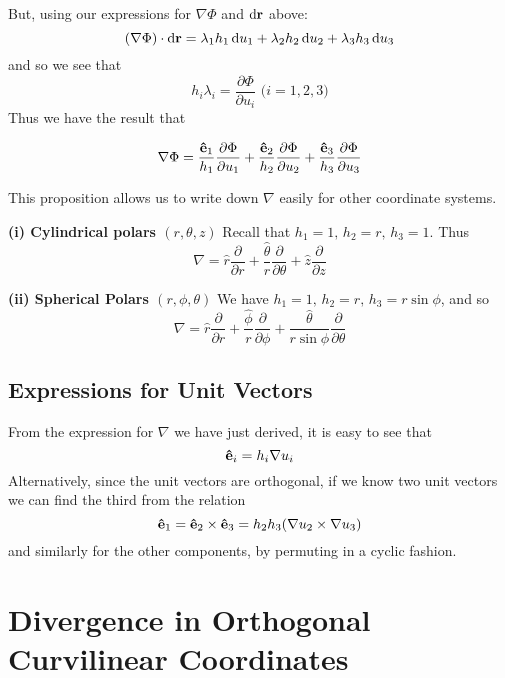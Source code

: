 But, using our expressions for $\nabla \Phi$ and $\d \mathbf r$ above:
\[
  (\nabla \Phi)\cdot \d \mathbf r = \lambda_1h_1\d u_1 + \lambda_2h_2\d u_2 + \lambda_3h_3\d u_3
\]
and so we see that 
\[
  h_i\lambda_i = \dfrac{\partial \Phi}{\partial u_i} \mbox{ ($i = 1,2,3$)}
\]
Thus we have the result that 

\begin{prop}
 \[
  \nabla \Phi = \dfrac{\mathbf{\hat e}_1}{h_1}\dfrac{\partial \Phi}{\partial u_1} + \dfrac{\mathbf{\hat e}_2}{h_2}\dfrac{\partial \Phi}{\partial u_2} + \dfrac{\mathbf{\hat e}_3}{h_3}\dfrac{\partial \Phi}{\partial u_3}
\]
\end{prop}


This proposition allows us to write down $\nabla$ easily for other coordinate systems. 


\textbf{(i) Cylindrical polars $(r,\theta,z)$}
Recall that $h_1 = 1,\, h_2 = r,\, h_3 = 1$. Thus
\[
  \nabla = \hat r \dfrac{\partial}{\partial r} + \dfrac{\hat 
  \theta}{r}\dfrac{\partial }{\partial \theta} + \hat z \dfrac{\partial }{\partial z}
\]

\textbf{(ii) Spherical Polars $(r,\phi,\theta)$}
We have $h_1 = 1,\, h_2 = r,\, h_3 = r\sin\phi$, and so 
\[
  \nabla = \hat r \dfrac{\partial }{\partial r} + \dfrac{\hat \phi}{r}\dfrac{\partial }{\partial \phi} + \dfrac{\hat \theta}{r \sin\phi}\dfrac{\partial }{\partial \theta}
\]

\subsection{Expressions for Unit Vectors}

From the expression for $\nabla$ we have just derived, it is easy to see that 
\[
  \mathbf{\hat e}_i = h_i \nabla u_i
\]
Alternatively, since the unit vectors are orthogonal, if we know two unit vectors we can find the third from the relation
\[
  \mathbf{\hat e}_1 = \mathbf{\hat e}_2 \times \mathbf{\hat e}_3 = h_2h_3(\nabla u_2 \times \nabla u_3)
\]
and similarly for the other components, by permuting in a cyclic fashion.


\section{Divergence in Orthogonal Curvilinear Coordinates}

